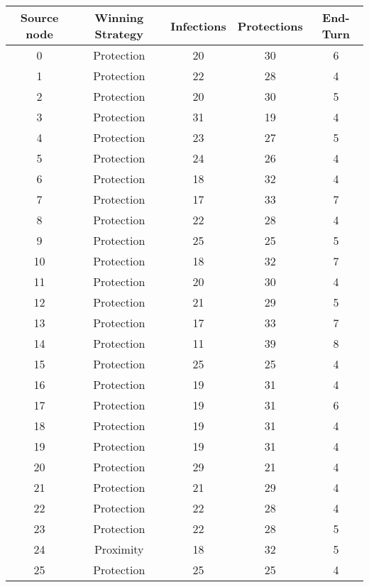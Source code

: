 \documentclass[results.tex]{subfiles}
\begin{document}
\begin{center}
  \begin{tabular}{| c || c | c | c | c |}
    \hline
    {\bfseries Source node} & {\bfseries Winning Strategy} & {\bfseries Infections} & {\bfseries Protections} & {\bfseries End-Turn} \\  %
    \hline\hline
    0 & Protection & 20 & 30 & 6 \\ 
    \hline
    1 & Protection & 22 & 28 & 4 \\ 
    \hline
    2 & Protection & 20 & 30 & 5 \\ 
    \hline
    3 & Protection & 31 & 19 & 4 \\ 
    \hline
    4 & Protection & 23 & 27 & 5 \\ 
    \hline
    5 & Protection & 24 & 26 & 4 \\ 
    \hline
    6 & Protection & 18 & 32 & 4 \\ 
    \hline
    7 & Protection & 17 & 33 & 7 \\ 
    \hline
    8 & Protection & 22 & 28 & 4 \\ 
    \hline
    9 & Protection & 25 & 25 & 5 \\ 
    \hline
    10 & Protection & 18 & 32 & 7 \\ 
    \hline
    11 & Protection & 20 & 30 & 4 \\ 
    \hline
    12 & Protection & 21 & 29 & 5 \\ 
    \hline
    13 & Protection & 17 & 33 & 7 \\ 
    \hline
    14 & Protection & 11 & 39 & 8 \\ 
    \hline
    15 & Protection & 25 & 25 & 4 \\ 
    \hline
    16 & Protection & 19 & 31 & 4 \\ 
    \hline
    17 & Protection & 19 & 31 & 6 \\ 
    \hline
    18 & Protection & 19 & 31 & 4 \\ 
    \hline
    19 & Protection & 19 & 31 & 4 \\ 
    \hline
    20 & Protection & 29 & 21 & 4 \\ 
    \hline
    21 & Protection & 21 & 29 & 4 \\ 
    \hline
    22 & Protection & 22 & 28 & 4 \\ 
    \hline
    23 & Protection & 22 & 28 & 5 \\ 
    \hline
    24 & Proximity & 18 & 32 & 5 \\ 
    \hline
    25 & Protection & 25 & 25 & 4 \\ 

\end{tabular}
\end{center}
\end{document}
